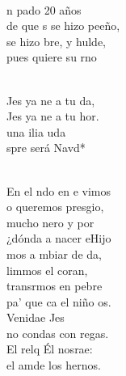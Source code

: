 \documentclass[12pt]{article}
\begin{document}
\begin{multicols*}{2}
\begin{cancion}%
	  \\
	n pado 20 años\\
	de que s se hizo peeño,\\
	se hizo bre, y hulde,\\
	pues  quiere su rno\\\jump\\
	\begin{chorus}%
	Jes ya ne a tu da,\\
	Jes ya ne a tu hor.\\
	una ilia uda \\
	spre será Navd*  \\
	\end{chorus}%
	\jump\\
	En el ndo en e vimos\\
	o queremos presgio,\\
	mucho nero y por\\
	¿dónda a nacer eHijo\\
	mos a mbiar de da,\\
	limmos el coran, \\
	transrmos en pebre \\
	pa' que ca el niño os.\\
	 Venidae Jes \\
	no condas con regas.\\
	El relq Él nosrae:\\
	el amde los hernos. \\
\end{cancion}%


\end{multicols*}
\end{document}
